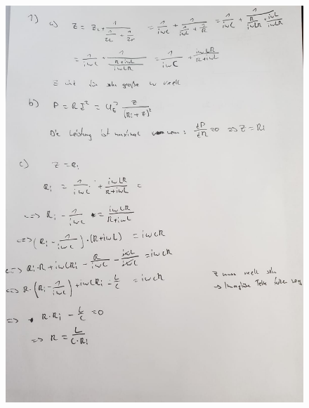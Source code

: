 \documentclass[11pt a4paper]{article}
\begin{document}
\thispagestyle{fancy}
\begin{figure}[H]
	\centering
	\includegraphics[width=15cm]{aufgabe1.jpg}
\end{figure}

\newpage
\setlength{\headheight}{0cm}
\end{document}
